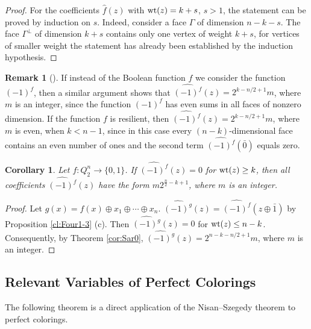 \documentclass[11pt]{article}
\newtheorem{corollary}{Corollary}[section]
\theoremstyle{definition}
\newtheorem{remark}{Remark}[section]
\newcommand{\wt}{{\rm wt}}
\begin{document}
{{{\begin{proof}
For the coefficients $\widehat{f}(z)$ with $\wt(z)=k+s$, $s>1$,
the statement can be proved by induction on $s$.  Indeed, consider a face
$\Gamma$ of dimension $n-k-s$. The face $\Gamma^\perp$
of dimension $k+s$ contains only one vertex of weight $k+s$,  for
vertices of smaller weight the statement has already been established by the induction
hypothesis.
\end{proof}

\begin{remark}[\cite{Taran02}]\label{cor:Sar1}
 If instead of the Boolean function $f$ we consider the function $(-1)^f$,
 then a similar argument shows that $\widehat{(-1)^f}(z)=2^{k-n/2+1}m$, where $m$ is an integer, 
 since the function $(-1)^f$ has even sums in all faces of nonzero dimension. If the function $f$ is
  resilient, then $\widehat{(-1)^f}(z)=2^{k-n/2+1}m$, where $m$ is even, when $k<n-1$, since in
  this case every $(n-k)$-dimensional face contains an even number of ones and  the second term $\widehat{(-1)^f}(\bar 0)$ equals zero.
\end{remark}

\begin{corollary}\label{corNS}
Let $f:Q^n_2\rightarrow \{0,1\}$. If $\widehat{(-1)^f}(z)=0$ for $\wt(z)\geq k$, then all coefficients $\widehat{(-1)^f}(z)$ have the form $m2^{\frac{n}{2}-k+1}$, where $m$ is an integer.
\end{corollary}
\begin{proof}
Let $g(x)=f(x)\oplus x_1\oplus \cdots\oplus x_n$.
$\widehat{(-1)^g}(z)=\widehat{(-1)^f}(z\oplus {\bar1})$ by Proposition \ref{cl:Four1-3} (c). Then
$\widehat{(-1)^g}(z)=0$ for $\wt(z)\leq n-k$. Consequently, by Theorem \ref{cor:Sar0},
$\widehat{(-1)^g}(z)=2^{n-k-n/2+1}m$, where $m$ is an integer.
\end{proof}



\subsection{Relevant Variables of Perfect Colorings}

The following theorem is a direct application of the Nisan--Szegedy theorem \cite{NiSz} to perfect colorings.

}}}
\end{document}
